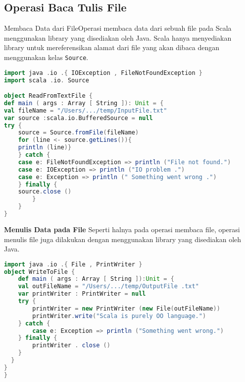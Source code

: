\subsection{Operasi Baca Tulis File}
Membaca Data dari FileOperasi membaca data dari sebuah file pada Scala menggunakan library yang disediakan oleh Java. Scala hanya menyediakan library untuk mereferensikan alamat dari file yang akan dibaca dengan menggunakan kelas \texttt{Source}.
\begin{lstlisting}[showstringspaces=false, language=Scala, caption= Membaca file teks]
import java .io .{ IOException , FileNotFoundException }
import scala .io. Source

object ReadFromTextFile {
def main ( args : Array [ String ]): Unit = {
val fileName = "/Users/.../temp/InputFile.txt"
var source :scala.io.BufferedSource = null
try {
	source = Source.fromFile(fileName)
	for (line <- source.getLines()){
	println (line)}
	} catch {
	case e: FileNotFoundException => println ("File not found.")
	case e: IOException => println ("IO problem .")
	case e: Exception => println (" Something went wrong .")
	} finally {
	source.close ()
		}
	}
}
\end{lstlisting}

\textbf{Menulis Data pada File}\newline
Seperti halnya pada operasi membaca file, operasi menulis file juga dilakukan dengan menggunakan
library yang disediakan oleh Java.
\begin{lstlisting}[showstringspaces=false,language=Scala, caption= Menulis file teks]
import java .io .{ File , PrintWriter }
object WriteToFile {
	def main ( args : Array [ String ]):Unit = {
	val outFileName = "/Users/.../temp/OutputFile .txt"
	var printWriter : PrintWriter = null
	try {
		printWriter = new PrintWriter (new File(outFileName))
		printWriter.write("Scala is purely OO language.")
	} catch {
		case e: Exception => println ("Something went wrong.")
	} finally {
		printWriter . close ()
	}
  }
}
}
\end{lstlisting}


